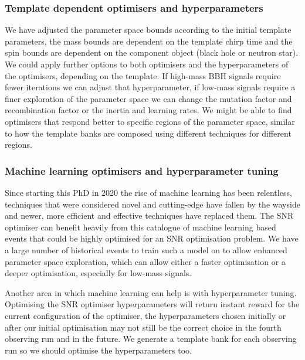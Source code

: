 \subsubsection{Template dependent optimisers and hyperparameters}

We have adjusted the parameter space bounds according to the initial template parameters, the mass bounds are dependent on the template chirp time and the spin bounds are dependent on the component object (black hole or neutron star). We could apply further options to both optimisers and the hyperparameters of the optimisers, depending on the template. If high-mass BBH signals require fewer iterations we can adjust that hyperparameter, if low-mass signals require a finer exploration of the parameter space we can change the mutation factor and recombination factor or the inertia and learning rates. We might be able to find optimisers that respond better to specific regions of the parameter space, similar to how the template banks are composed using different techniques for different regions.


\subsubsection{Machine learning optimisers and hyperparameter tuning}

Since starting this PhD in 2020 the rise of machine learning has been relentless, techniques that were considered novel and cutting-edge have fallen by the wayside and newer, more efficient and effective techniques have replaced them. The SNR optimiser can benefit heavily from this catalogue of machine learning based events that could be highly optimised for an SNR optimisation problem. We have a large number of historical events to train such a model on to allow enhanced parameter space exploration, which can allow either a faster optimisation or a deeper optimisation, especially for low-mass signals.

Another area in which machine learning can help is with hyperparameter tuning. Optimising the SNR optimiser hyperparameters will return instant reward for the current configuration of the optimiser, the hyperparameters chosen initially or after our initial optimisation may not still be the correct choice in the fourth observing run and in the future. We generate a template bank for each observing run so we should optimise the hyperparameters too.





